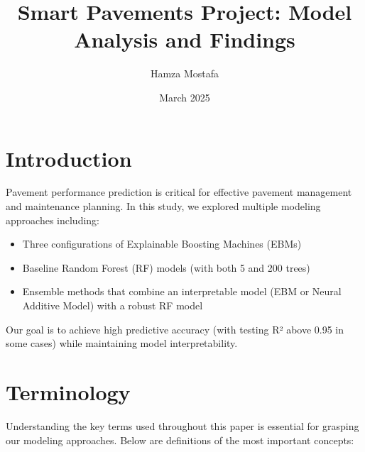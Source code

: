 \documentclass{article}
\title{Smart Pavements Project: Model Analysis and Findings}
\author{Hamza Mostafa}
\date{March 2025}
\begin{document}
\maketitle

\section{Introduction}
Pavement performance prediction is critical for effective pavement management and maintenance planning. In this study, we explored multiple modeling approaches including:
\begin{itemize}
    \item Three configurations of Explainable Boosting Machines (EBMs)
    \item Baseline Random Forest (RF) models (with both 5 and 200 trees)
    \item Ensemble methods that combine an interpretable model (EBM or Neural Additive Model) with a robust RF model
\end{itemize}
Our goal is to achieve high predictive accuracy (with testing R² above 0.95 in some cases) while maintaining model interpretability.

\section{Terminology}

Understanding the key terms used throughout this paper is essential for grasping our modeling approaches. Below are definitions of the most important concepts:
\end{document}
